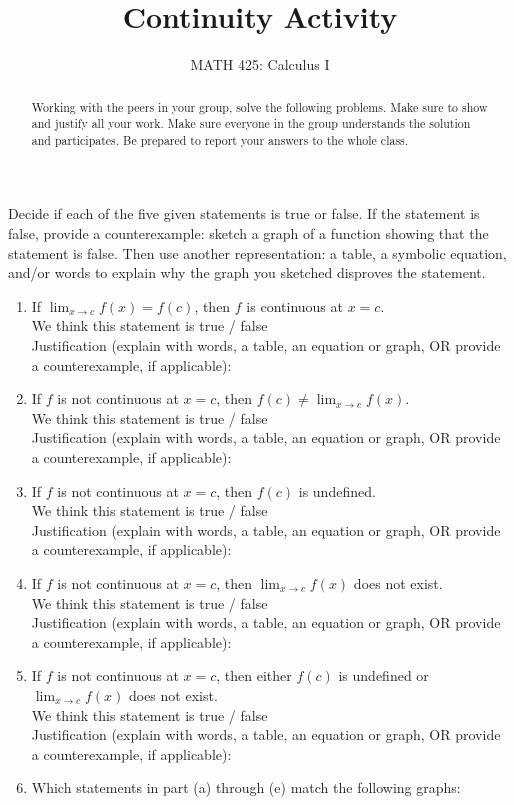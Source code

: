 \documentclass{ximera}
\title{Continuity Activity}
\author{MATH 425: Calculus I}
\begin{document}
\begin{abstract}
     Working with the peers in your group, solve the following problems. Make sure to show and justify all your work. Make sure everyone in the group understands the solution and participates. Be prepared to report your answers to the whole class. 
\end{abstract}
\maketitle

\begin{exercise}
     Decide if each of the five given statements is true or false.  If the statement is false, provide a counterexample: sketch a graph of a function showing that the statement is false.  Then use another representation: a table, a symbolic equation, and/or words to explain why the graph you sketched disproves the statement. 
    \begin{enumerate}
        \item If $\lim_{x\rightarrow c}f(x)=f(c)$, then $f$ is continuous at $x=c$.  \\
        We think this statement is true / false\\
        Justification (explain with words, a table, an equation or graph, OR provide a counterexample, if applicable):
        \item If $f$ is not continuous at $x=c$, then $f(c)\neq \lim_{x\rightarrow c}f(x)$.\\
        We think this statement is true / false\\
        Justification (explain with words, a table, an equation or graph, OR provide a counterexample, if applicable):
        \item If $f$ is not continuous at $x=c$, then $f(c)$ is undefined.\\
        We think this statement is true / false\\
        Justification (explain with words, a table, an equation or graph, OR provide a counterexample, if applicable):
        \item If $f$ is not continuous at $x=c$, then $\lim_{x\rightarrow c}f(x)$ does not exist.\\
        We think this statement is true / false\\
        Justification (explain with words, a table, an equation or graph, OR provide a counterexample, if applicable):
        \item If $f$ is not continuous at $x=c$, then either $f(c)$ is undefined or $\lim_{x\rightarrow c}f(x)$ does not exist.\\
        We think this statement is true / false\\
        Justification (explain with words, a table, an equation or graph, OR provide a counterexample, if applicable):
        \item Which statements in part (a) through (e) match the following graphs:
        

\end{enumerate}
\end{exercise}
\end{document}
